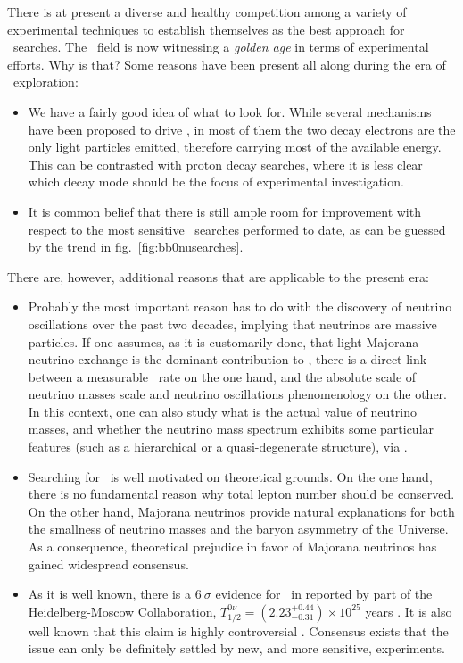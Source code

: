 There is at present a diverse and healthy competition among a variety of experimental techniques to establish themselves as the best approach for \bbonu\ searches. The \bbonu\ field is now witnessing a \emph{golden age} in terms of experimental efforts. Why is that? Some reasons have been present all along during the era of \bbonu\ exploration:
%
\begin{itemize}
%
\item We have a fairly good idea of what to look for. While several mechanisms have been proposed to drive \bbonu, in most of them the two decay electrons are the only light particles emitted, therefore carrying most of the available energy. This can be contrasted with proton decay searches, where it is less clear which decay mode should be the focus of experimental investigation.
%
\item It is common belief that there is still ample room for improvement with respect to the most sensitive \bbonu\ searches performed to date, as can be guessed by the trend in fig.~\ref{fig:bb0nusearches}.
\end{itemize}
%
There are, however, additional reasons that are applicable to the present era: 
\begin{itemize}
\item Probably the most important reason has to do with the discovery of neutrino oscillations over the past two decades, implying that neutrinos are massive particles. If one assumes, as it is customarily done, that light Majorana neutrino exchange is the dominant contribution to \bbonu, there is a direct link between a measurable \bbonu\ rate on the one hand, and the absolute scale of neutrino masses scale and neutrino oscillations phenomenology on the other. In this context, one can also study what is the actual value of neutrino masses, and whether the neutrino mass spectrum exhibits some particular features (such as a hierarchical or a quasi-degenerate structure), via \bbonu. 
%
\item Searching for \bbonu\ is well motivated on theoretical grounds. On the one hand, there is no fundamental reason why total lepton number should be conserved. On the other hand, Majorana neutrinos provide natural explanations for both the smallness of neutrino masses and the baryon asymmetry of the Universe. As a consequence, theoretical prejudice in favor of Majorana neutrinos has gained widespread consensus. 
%
\item As it is well known, there is a $6\ \sigma$ evidence for \bbonu\ in  reported by part of the Heidelberg-Moscow Collaboration, $T_{1/2}^{0\nu}=(2.23^{+0.44}_{-0.31})\times 10^{25}$ years \cite{Klapdor-Kleingrothaus:2006zcr}. It is also well known that this claim is highly controversial \cite{Aalseth:2002dt}. Consensus exists that the issue can only be definitely settled by new, and more sensitive, experiments.
\end{itemize}

